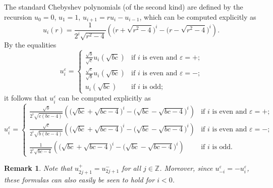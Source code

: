 \documentclass{amsart}
\newtheorem{remark}[theorem]{Remark}
\numberwithin{theorem}{section}
\newcommand{\ZZ}{\mathbb{Z}}
\begin{document}
  The standard Chebyshev polynomials (of the second kind) are defined by the recursion $u_0=0$, $u_1=1$, $u_{i+1}=ru_i-u_{i-1}$, which can be computed explicitly as
  \[u_i(r)=\frac{1}{2^i\sqrt{r^2-4}}\left(\big(r+\sqrt{r^2-4}\big)^i-\big(r-\sqrt{r^2-4}\big)^i\right).\]
  By the equalities 
  \[u_i^\varepsilon=\begin{cases} \frac{\sqrt{b}}{\sqrt{c}}u_i(\sqrt{bc}) & \text{if $i$ is even and $\varepsilon=+$;}\\ \frac{\sqrt{c}}{\sqrt{b}}u_i(\sqrt{bc}) & \text{if $i$ is even and $\varepsilon=-$;}\\ u_i(\sqrt{bc}) & \text{if $i$ is odd;} \end{cases}\]
  it follows that $u_i^\varepsilon$ can be computed explicitly as
  \[u_i^\varepsilon=\begin{cases} \frac{\sqrt{b}}{2^i\sqrt{c(bc-4)}}\left(\big(\sqrt{bc}+\sqrt{bc-4}\big)^i-\big(\sqrt{bc}-\sqrt{bc-4}\big)^i\right) & \text{if $i$ is even and $\varepsilon=+$;}\\ \frac{\sqrt{c}}{2^i\sqrt{b(bc-4)}}\left(\big(\sqrt{bc}+\sqrt{bc-4}\big)^i-\big(\sqrt{bc}-\sqrt{bc-4}\big)^i\right) & \text{if $i$ is even and $\varepsilon=-$;}\\ \frac{1}{2^i\sqrt{bc-4}}\left(\big(\sqrt{bc}+\sqrt{bc-4}\big)^i-\big(\sqrt{bc}-\sqrt{bc-4}\big)^i\right) & \text{if $i$ is odd.} \end{cases}\]
  \begin{remark}
    Note that $u_{2j+1}^+=u_{2j+1}^-$ for all $j\in\ZZ$.
    Moreover, since $u_{-i}^\varepsilon=-u_i^\varepsilon$, these formulas can also easily be seen to hold for $i<0$.
  \end{remark}
\end{document}
